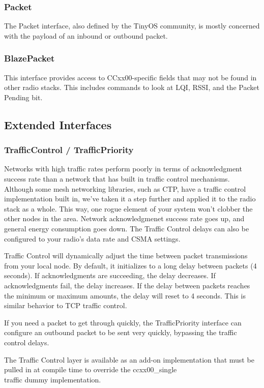 \documentclass{article}
\begin{document}
\subsubsection{Packet}
The Packet interface, also defined by the TinyOS community,
is mostly concerned with the payload of an inbound or outbound packet.

\subsubsection{BlazePacket}
This interface provides access to CCxx00-specific fields that may not be found in other
radio stacks.  This includes commands to look at LQI, RSSI, and the Packet Pending bit.

\subsection{Extended Interfaces}
\label{sec:extendedinterfaces}

\subsubsection{TrafficControl / TrafficPriority}
Networks with high traffic rates perform poorly in terms of acknowledgment success rate
than a network that has built in traffic control mechanisms. Although
some mesh networking libraries, such as CTP, have a traffic control implementation
built in, we've taken it a step further and applied it to the radio stack as a whole.
This way, one rogue element of your system won't clobber the other nodes in the area.
Network acknowledgmenet success rate goes up, and general energy consumption goes down.
The Traffic Control delays can also be configured to your radio's data rate and CSMA settings.

Traffic Control will dynamically adjust the time between packet transmissions from your local
node. By default, it initializes to a long delay between packets (4 seconds).  If acknowledgments are succeeding,
the delay decreases.  If acknowledgments fail, the delay increases.  If the delay between
packets reaches the minimum or maximum amounts, the delay will reset to 4 seconds. This is
similar behavior to TCP traffic control.

If you need a packet to get through quickly, the TrafficPriority interface can configure an outbound packet 
to be sent very quickly, bypassing the traffic control delays.

The Traffic Control layer is available as an add-on implementation that must be pulled in at compile time to override
the ccxx00\_single\\traffic dummy implementation.
\end{document}
